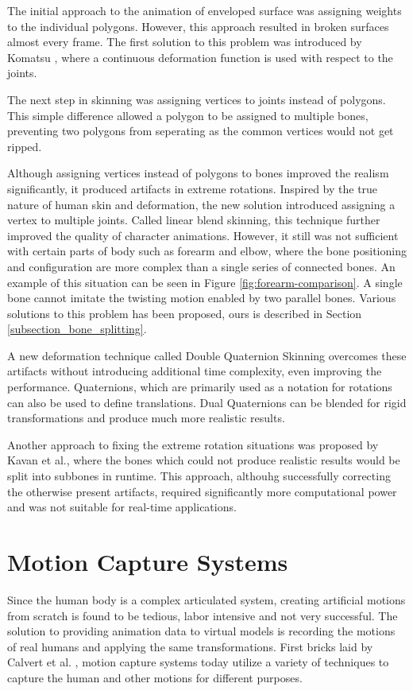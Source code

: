 The initial approach to the animation of enveloped surface was assigning weights to the individual polygons. However, this approach resulted in broken surfaces
almost every frame. The first solution to this problem was introduced by Komatsu \cite{Komatsu1988}, where a continuous deformation function is used with respect 
to the joints. 

The next step in skinning was assigning vertices to joints instead of polygons\cite{Lander1988}. This simple difference allowed a polygon to be assigned to multiple bones, 
preventing two polygons from seperating as the common vertices would not get ripped.

Although assigning vertices instead of polygons to bones improved the realism significantly, it produced artifacts in extreme rotations. Inspired by the true 
nature of human skin and deformation, the new solution introduced assigning a vertex to multiple joints. Called linear blend skinning, this technique further 
improved the quality of character animations. However, it still was not sufficient with certain parts of body such as forearm and elbow, where the bone 
positioning and configuration are more complex than a single series of connected bones. An example of this situation can be seen in Figure \ref{fig:forearm-comparison}.
A single bone cannot imitate the twisting motion enabled by two parallel bones. Various solutions to this problem has been proposed, ours is described in 
Section \ref{subsection_bone_splitting}. 

A new deformation technique called Double Quaternion Skinning overcomes these artifacts without introducing additional time complexity\cite{Kavan2007}, even 
improving the performance. Quaternions, which are primarily used as a notation for rotations can also be used to define translations. Dual Quaternions can 
be blended for rigid transformations and produce much more realistic results.

Another approach to fixing the extreme rotation situations was proposed by Kavan et al.\cite{Kavan2009}, where the bones which could not produce realistic 
results would be split into subbones in runtime. This approach, althouhg successfully correcting the otherwise present artifacts, required significantly more
computational power and was not suitable for real-time applications. 


\section{Motion Capture Systems}
\label{section_related_mocap}
 Since the human body is a complex articulated system, creating artificial motions from scratch is found to be tedious, labor intensive and not very successful.
 The solution to providing animation data to virtual models is recording the motions of real humans and applying the same transformations. First bricks laid by
 Calvert et al. \cite{Calvert1982}, motion capture systems today utilize a variety of techniques to capture the human and other motions for different purposes.
 
